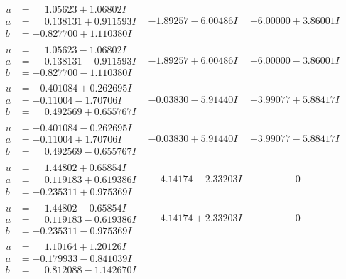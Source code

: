 \documentclass[1p]{elsarticle_modified}
\theoremstyle{definition}
\begin{document}
$$\begin{array}{c|c|c}
\begin{aligned}
u &= \phantom{-}1.05623 + 1.06802 I \\
a &= \phantom{-}0.138131 + 0.911593 I \\
b &= -0.827700 + 1.110380 I\end{aligned}
 & -1.89257 - 6.00486 I & -6.00000 + 3.86001 I \\ \hline\begin{aligned}
u &= \phantom{-}1.05623 - 1.06802 I \\
a &= \phantom{-}0.138131 - 0.911593 I \\
b &= -0.827700 - 1.110380 I\end{aligned}
 & -1.89257 + 6.00486 I & -6.00000 - 3.86001 I \\ \hline\begin{aligned}
u &= -0.401084 + 0.262695 I \\
a &= -0.11004 - 1.70706 I \\
b &= \phantom{-}0.492569 + 0.655767 I\end{aligned}
 & -0.03830 - 5.91440 I & -3.99077 + 5.88417 I \\ \hline\begin{aligned}
u &= -0.401084 - 0.262695 I \\
a &= -0.11004 + 1.70706 I \\
b &= \phantom{-}0.492569 - 0.655767 I\end{aligned}
 & -0.03830 + 5.91440 I & -3.99077 - 5.88417 I \\ \hline\begin{aligned}
u &= \phantom{-}1.44802 + 0.65854 I \\
a &= \phantom{-}0.119183 + 0.619386 I \\
b &= -0.235311 + 0.975369 I\end{aligned}
 & \phantom{-}4.14174 - 2.33203 I & \phantom{-0.000000 } 0 \\ \hline\begin{aligned}
u &= \phantom{-}1.44802 - 0.65854 I \\
a &= \phantom{-}0.119183 - 0.619386 I \\
b &= -0.235311 - 0.975369 I\end{aligned}
 & \phantom{-}4.14174 + 2.33203 I & \phantom{-0.000000 } 0 \\ \hline\begin{aligned}
u &= \phantom{-}1.10164 + 1.20126 I \\
a &= -0.179933 - 0.841039 I \\
b &= \phantom{-}0.812088 - 1.142670 I\end{aligned}

\end{array}$$
\end{document}
